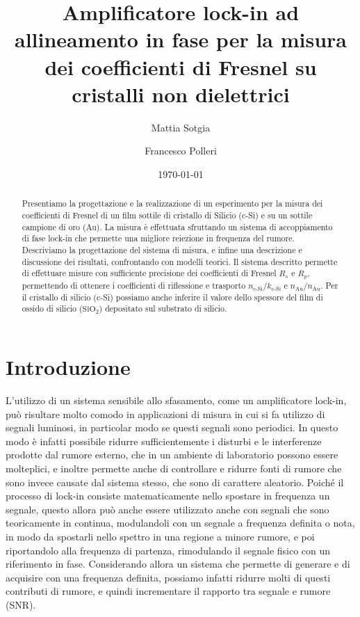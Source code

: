 \documentclass[prb,showpacs,floatfix,altaffilletter,amsmath,amssymb,reprint,citeautoscript]{revtex4-1}
\begin{document}
\title{Amplificatore lock-in ad allineamento in fase per la misura dei coefficienti di Fresnel su cristalli non dielettrici}
\author{Mattia Sotgia}
\author{Francesco Polleri}
\date{\today}

\begin{abstract}
    Presentiamo la progettazione e la realizzazione di un esperimento per la misura dei coefficienti di Fresnel di un film sottile di cristallo di Silicio (c-Si) e su un sottile campione di oro (Au). La misura è effettuata sfruttando un sistema di accoppiamento di fase lock-in\cite{scofieldFrequencydomainDescriptionLockin1994} che permette una migliore reiezione in frequenza del rumore. Descriviamo la progettazione del sistema di misura, e infine una descrizione e discussione dei risultati, confrontando con modelli teorici. Il sistema descritto permette di effettuare misure con sufficiente precisione dei coefficienti di Fresnel $R_s$ e $R_p$, permettendo di ottenere i coefficienti di riflessione e trasporto $n_\text{c-Si}/k_\text{c-Si}$ e $n_\text{Au}/n_\text{Au}$. Per il cristallo di silicio (c-Si) possiamo anche inferire il valore dello spessore del film di ossido di silicio ($\mathrm{SiO_2}$) depositato sul substrato di silicio.
\end{abstract}
\maketitle

\section{Introduzione} 

L'utilizzo di un sistema sensibile allo sfasamento, come un amplificatore lock-in, può risultare molto comodo in applicazioni di misura in cui si fa utilizzo di segnali luminosi, in particolar modo se questi segnali sono periodici. In questo modo è infatti possibile ridurre sufficientemente i disturbi e le interferenze prodotte dal rumore esterno, che in un ambiente di laboratorio possono essere molteplici, e inoltre permette anche di controllare e ridurre fonti di rumore che sono invece causate dal sistema stesso, che sono di carattere aleatorio. Poiché il processo di lock-in consiste matematicamente nello spostare in frequenza un segnale, questo allora può anche essere utilizzato anche con segnali che sono teoricamente in continua, modulandoli con un segnale a frequenza definita o nota, in modo da spostarli nello spettro in una regione a minore rumore, e poi riportandolo alla frequenza di partenza, rimodulando il segnale fisico con un riferimento in fase. Considerando allora un sistema che permette di generare e di acquisire con una frequenza definita, possiamo infatti ridurre molti di questi contributi di rumore, e quindi incrementare il rapporto tra segnale e rumore (SNR). 
\end{document}
